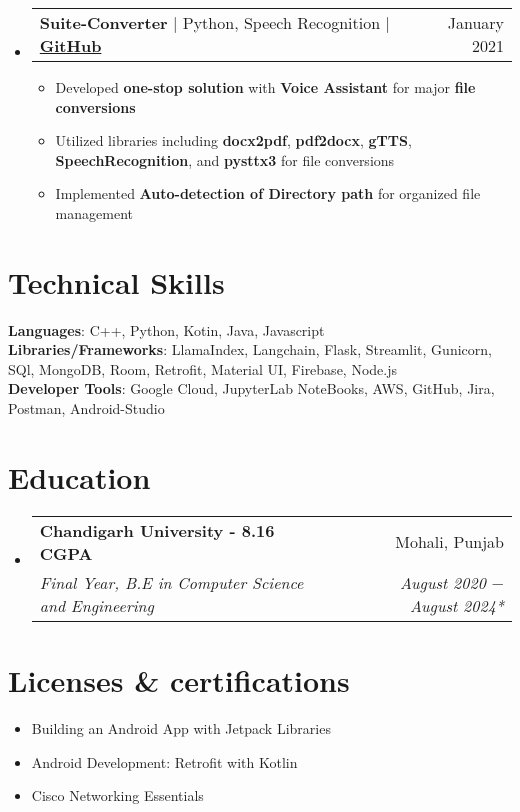 \documentclass[letterpaper,11pt]{article}
\makeatletter
\newcommand{\resumeItem}[1]{
  \item\small{
    {#1 \vspace{-2pt}}
  }
}
\newcommand{\resumeSubheading}[4]{
  \vspace{-2pt}\item
    \begin{tabular*}{0.97\textwidth}[t]{l@{\extracolsep{\fill}}r}
      \textbf{#1} & #2 \\
      \textit{\small#3} & \textit{\small #4} \\
    \end{tabular*}\vspace{-7pt}
}
\newcommand{\resumeProjectHeading}[2]{
    \item
    \begin{tabular*}{0.97\textwidth}{l@{\extracolsep{\fill}}r}
      \small#1 & #2 \\
    \end{tabular*}\vspace{-7pt}
}
\newcommand{\resumeSubHeadingListStart}{\begin{itemize}[leftmargin=0.15in, label={}]}
\newcommand{\resumeSubHeadingListEnd}{\end{itemize}}
\newcommand{\resumeItemListStart}{\begin{itemize}}
\newcommand{\resumeItemListEnd}{\end{itemize}\vspace{-5pt}}
\makeatother
\begin{document}
 \resumeSubHeadingListStart
      \resumeProjectHeading
          {\textbf{Suite-Converter } $|${ Python, Speech Recognition} $|$ \textbf{\href{https://github.com/aniketk13/Suite-Converter}{GitHub}} }{January 2021}
          \resumeItemListStart
          \resumeItem{Developed \textbf{one-stop solution} with \textbf{Voice Assistant} for major \textbf{file conversions}}
          \resumeItem{Utilized libraries including \textbf{docx2pdf}, \textbf{pdf2docx}, \textbf{gTTS}, \textbf{SpeechRecognition}, and \textbf{pysttx3} for file conversions}
          \resumeItem{Implemented \textbf{Auto-detection of Directory path} for organized file management}
          \resumeItemListEnd
    \resumeSubHeadingListEnd    
\section{\textbf{Technical Skills}}
 \begin{itemize}[leftmargin=0.15in, label={}]
    \small{\item{
     \textbf{Languages}{: C++, Python, Kotin, Java, Javascript} \\
     \textbf{Libraries/Frameworks}{: LlamaIndex, Langchain, Flask, Streamlit, Gunicorn, SQl, MongoDB, Room, Retrofit, Material UI, Firebase, Node.js } \\
     \textbf{Developer Tools}{: Google Cloud, JupyterLab NoteBooks, AWS, GitHub, Jira, Postman, Android-Studio}
    }} 
 \end{itemize}

\section{\textbf{Education}}
  \resumeSubHeadingListStart
    \resumeSubheading
      {Chandigarh University - 8.16 CGPA}{Mohali, Punjab}
      {Final Year, B.E in Computer Science and Engineering}{August 2020 $-$ August 2024*}
  \resumeSubHeadingListEnd
  
\section{\textbf{Licenses \& certifications}}
 \begin{itemize}[leftmargin=0.15in, label={}]
    \small{\item{
        \resumeItemListStart
                \resumeItem{{{Building an Android App with Jetpack Libraries}}}
                \resumeItem{{{Android Development: Retrofit with Kotlin}}} 
                \resumeItem{{{Cisco Networking Essentials}}}  
      \resumeItemListEnd
    }}
 \end{itemize}
    
\end{document}
